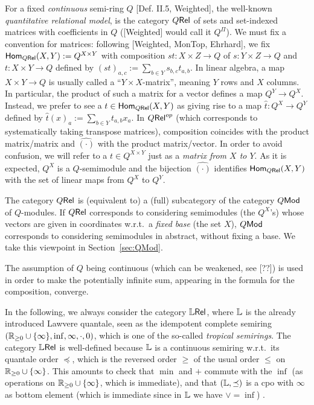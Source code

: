 For a fixed \emph{continuous} semi-ring $Q$ [Def. II.5, Weighted], the well-known \emph{quantitative relational model}, is the category $Q \mathsf{Rel}$ of sets and set-indexed matrices with coefficients in $Q$ ([Weighted] would call it $Q^\Pi$).
We must fix a convention for matrices: following [Weighted, MonTop, Ehrhard], we fix $\mathsf{Hom}_{Q \mathsf{Rel}}(X,Y):=Q^{X\times Y}$ with composition $st:X\times Z\to Q$ of $s:Y\times Z\to Q$ and $t:X\times Y\to Q$ defined by $(st)_{a,c}:=\sum\limits_{b\in Y} s_{b,c}t_{a,b}$.
In linear algebra, a map $X\times Y\to Q$ is usually called a ``$Y\times X$-matrix'', meaning $Y$ rows and $X$ columns.
In particular, the product of such a matrix for a vector defines a map $Q^Y\to Q^X$.
Instead, we prefer to see a $t\in\mathsf{Hom}_{Q \mathsf{Rel}}(X,Y)$ as giving rise to a map $\hat t:Q^X\to Q^Y$ defined by $\hat t(x)_a:=\sum\limits_{b\in Y} t_{a,b}x_a$.
In $Q \mathsf{Rel}^{op}$ (which corresponds to systematically taking transpose matrices), composition coincides with the product matrix/matrix and $\hat{(\cdot)}$ with the product matrix/vector.
In order to avoid confusion, we will refer to a $t\in Q^{X\times Y}$ just as a \emph{matrix from $X$ to $Y$}.
As it is expected, $Q^X$ is a $Q$-semimodule and the bijection $\hat{(\cdot)}$ identifies $\mathsf{Hom}_{Q \mathsf{Rel}}(X,Y)$ with the set of linear maps from $Q^X$ to $Q^Y$.

\begin{remark}
 The category $Q \mathsf{Rel}$ is (equivalent to) a (full) subcategory of the category $Q\mathsf{Mod}$ of $Q$-modules.
 If $Q \mathsf{Rel}$ corresponds to considering semimodules (the $Q^X$'s) whose vectors are given in coordinates w.r.t.\ a \emph{fixed base} (the set $X$), $Q\mathsf{Mod}$ corresponds to considering semimodules in abstract, without fixing a base.
 We take this viewpoint in Section~\ref{sec:QMod}.
\end{remark}

The assumption of $Q$ being continuous (which can be weakened, see [??]) is used in order to make the potentially infinite sum, appearing in the formula for the composition, converge.

In the following, we always consider the category $\mathbb{L} \mathsf{Rel}$, where $\mathbb{L}$ is the already introduced Lawvere quantale, seen as the idempotent complete semiring $(\mathbb{R}_{\geq0}\cup\{\infty\},\inf,\infty,\cdot,0)$, which is one of the so-called \emph{tropical semirings}.
The category $\mathbb{L} \mathsf{Rel}$ is well-defined because $\mathbb{L}$ is a continuous semiring w.r.t.\ its quantale order $\preceq$, which is the reversed order $\geq$ of the usual order $\leq$ on $\mathbb{R}_{\geq0}\cup\{\infty\}$.
This amounts to check that $\min$ and $+$ commute with the $\inf$ (as operations on $\mathbb{R}_{\geq0}\cup\{\infty\}$, which is immediate), and that $(\mathbb{L},\preceq)$ is a cpo with $\infty$ as bottom element (which is immediate since in $\mathbb{L}$ we have $\vee = \inf$) .

